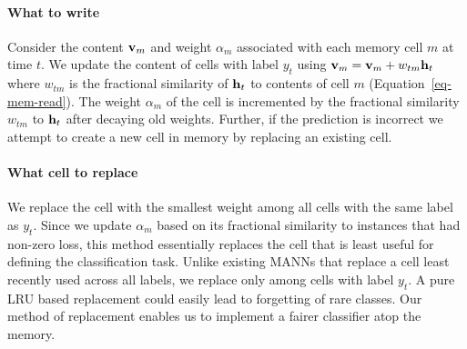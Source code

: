 \documentclass[letterpaper]{article} %
\newcommand{\vek}[1]{{\bf {#1}}}
\newcommand{\vh}{{\vek{h}}}
\newcommand{\vM}{{\vek{v}}}
\begin{document}
\paragraph{What to write}
Consider the content $\vM_m$ and weight $\alpha_m$ associated with
each memory cell $m$ at time $t$.   We update the content of cells with label $y_t$ using $\vM_{m} = \vM_{m} + w_{tm}{\vh_t}$ where $w_{tm}$ is the fractional similarity of $\vh_t$ to contents of cell $m$ (Equation~\ref{eq-mem-read}). The weight $\alpha_m$ of the cell is incremented by the fractional similarity $w_{tm}$ to $\vh_t$ after decaying old weights.
Further, if the prediction is incorrect we attempt to create a new cell in memory  by replacing an existing cell.
%
\paragraph{What cell to replace} We replace the cell with the smallest weight among all cells with the same label as $y_t$. %
Since we update $\alpha_m$ based on its fractional similarity to instances that had non-zero loss, this method essentially replaces the cell that is least useful for defining the classification task.  Unlike existing MANNs that replace a cell least recently used across all labels, we replace only among cells with label $y_t$. A pure LRU based replacement could easily lead to forgetting of rare classes.  Our method of replacement enables us to implement a fairer classifier atop the memory.
\end{document}
